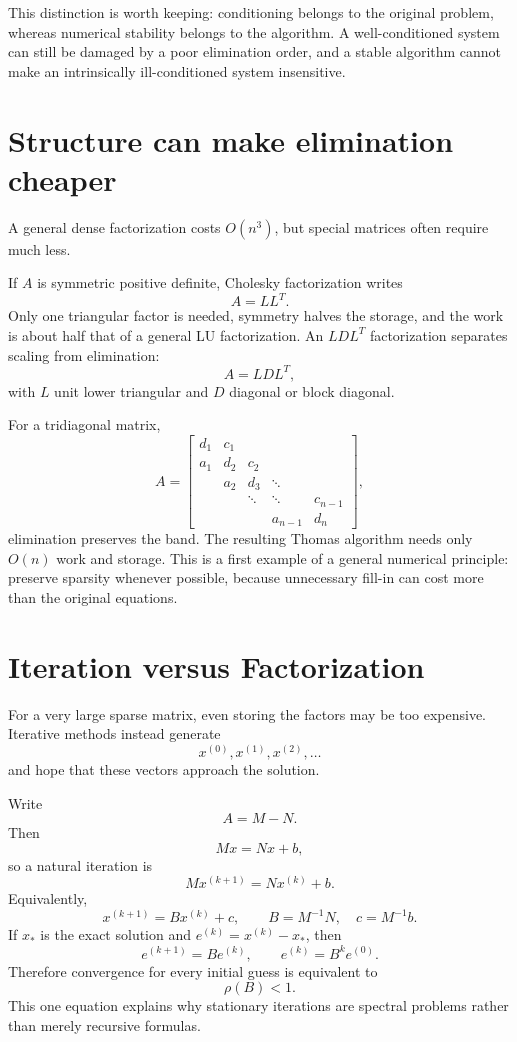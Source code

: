 This distinction is worth keeping: conditioning belongs to the original problem, whereas numerical stability belongs to the algorithm.  A well-conditioned system can still be damaged by a poor elimination order, and a stable algorithm cannot make an intrinsically ill-conditioned system insensitive.

\section{Structure can make elimination cheaper}

A general dense factorization costs \(O(n^3)\), but special matrices often require much less.

If \(A\) is symmetric positive definite, Cholesky factorization writes
\[
  A=LL^T.
\]
Only one triangular factor is needed, symmetry halves the storage, and the work is about half that of a general LU factorization.  An \(LDL^T\) factorization separates scaling from elimination:
\[
  A=LDL^T,
\]
with \(L\) unit lower triangular and \(D\) diagonal or block diagonal.

For a tridiagonal matrix,
\[
  A=
  \begin{bmatrix}
    d_1&c_1\\
    a_1&d_2&c_2\\
    &a_2&d_3&\ddots\\
    &&\ddots&\ddots&c_{n-1}\\
    &&&a_{n-1}&d_n
  \end{bmatrix},
\]
elimination preserves the band.  The resulting Thomas algorithm needs only \(O(n)\) work and storage.  This is a first example of a general numerical principle: preserve sparsity whenever possible, because unnecessary fill-in can cost more than the original equations.

\section{Iteration versus Factorization}

For a very large sparse matrix, even storing the factors may be too expensive.  Iterative methods instead generate
\[
  x^{(0)},x^{(1)},x^{(2)},\ldots
\]
and hope that these vectors approach the solution.

Write
\[
  A=M-N.
\]
Then
\[
  Mx=Nx+b,
\]
so a natural iteration is
\[
  Mx^{(k+1)}=Nx^{(k)}+b.
\]
Equivalently,
\[
  x^{(k+1)}=Bx^{(k)}+c,
  \qquad
  B=M^{-1}N,
  \quad c=M^{-1}b.
\]
If \(x_*\) is the exact solution and \(e^{(k)}=x^{(k)}-x_*\), then
\[
  e^{(k+1)}=Be^{(k)},
  \qquad
  e^{(k)}=B^ke^{(0)}.
\]
Therefore convergence for every initial guess is equivalent to
\[
  \rho(B)<1.
\]
This one equation explains why stationary iterations are spectral problems rather than merely recursive formulas.

